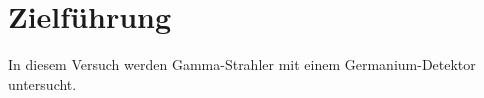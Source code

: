 \section{Zielführung}
In diesem Versuch werden Gamma-Strahler mit einem Germanium-Detektor untersucht. 